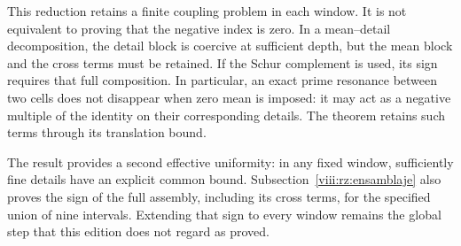 This reduction retains a finite coupling problem in each window. It is not equivalent to proving that the negative index is zero. In a mean–detail decomposition, the detail block is coercive at sufficient depth, but the mean block and the cross terms must be retained. If the Schur complement is used, its sign requires that full composition. In particular, an exact prime resonance between two cells does not disappear when zero mean is imposed: it may act as a negative multiple of the identity on their corresponding details. The theorem retains such terms through its translation bound.

The result provides a second effective uniformity: in any fixed window, sufficiently fine details have an explicit common bound. Subsection~\ref{viii:rz:ensamblaje} also proves the sign of the full assembly, including its cross terms, for the specified union of nine intervals. Extending that sign to every window remains the global step that this edition does not regard as proved.
